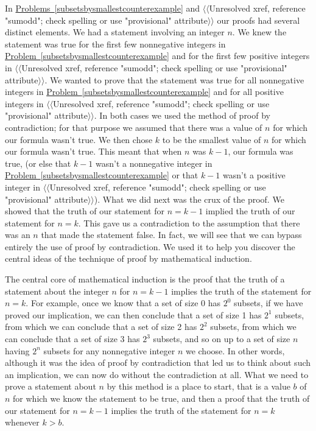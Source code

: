 \documentclass[10pt,]{book}
\theoremstyle{plain}
\theoremstyle{definition}
\numberwithin{equation}{chapter}
\begin{document}
In \hyperref[subsetsbysmallestcounterexample]{Problems~\ref{subsetsbysmallestcounterexample}} and {$\langle\langle$Unresolved xref, reference "sumodd"; check spelling or use "provisional" attribute$\rangle\rangle$} our proofs had several distinct elements. We had a statement involving an integer \(n\). We knew the statement was true for the first few nonnegative integers in \hyperref[subsetsbysmallestcounterexample]{Problem~\ref{subsetsbysmallestcounterexample}} and for the first few positive integers in {$\langle\langle$Unresolved xref, reference "sumodd"; check spelling or use "provisional" attribute$\rangle\rangle$}. We wanted to prove that the statement was true for all nonnegative integers in \hyperref[subsetsbysmallestcounterexample]{Problem~\ref{subsetsbysmallestcounterexample}} and for all positive integers in {$\langle\langle$Unresolved xref, reference "sumodd"; check spelling or use "provisional" attribute$\rangle\rangle$}. In both cases we used the method of proof by contradiction; for that purpose we assumed that there was a value of \(n\) for which our formula wasn't true. We then chose \(k\) to be the smallest value of \(n\) for which our formula wasn't true. This meant that when \(n\) was \(k-1\), our formula was true, (or else that \(k-1\) wasn't a nonnegative integer in \hyperref[subsetsbysmallestcounterexample]{Problem~\ref{subsetsbysmallestcounterexample}} or that \(k-1\) wasn't a positive integer in {$\langle\langle$Unresolved xref, reference "sumodd"; check spelling or use "provisional" attribute$\rangle\rangle$}). What we did next was the crux of the proof. We showed that the truth of our statement for \(n=k-1\) implied the truth of our statement for \(n=k\). This gave us a contradiction to the assumption that there was an \(n\) that made the statement false. In fact, we will see that we can bypass entirely the use of proof by contradiction. We used it to help you discover the central ideas of the technique of proof by mathematical induction.%
\par
The central core of mathematical induction is the proof that the truth of a statement about the integer \(n\) for \(n=k-1\) implies the truth of the statement for \(n=k\). For example, once we know that a set of size 0 has \(2^0\) subsets, if we have proved our implication, we can then conclude that a set of size 1 has \(2^1\) subsets, from which we can conclude that a set of size 2 has \(2^2\) subsets, from which we can conclude that a set of size 3 has \(2^3\) subsets, and so on up to a set of size \(n\) having \(2^n\) subsets for any nonnegative integer \(n\) we choose. In other words, although it was the idea of proof by contradiction that led us to think about such an implication, we can now do without the contradiction at all. What we need to prove a statement about \(n\) by this method is a place to start, that is a value \(b\) of \(n\) for which we know the statement to be true, and then a proof that the truth of our statement for \(n=k-1\) implies the truth of the statement for \(n=k\) whenever \(k>b\).%
\typeout{************************************************}
\typeout{************************************************}
\end{document}
